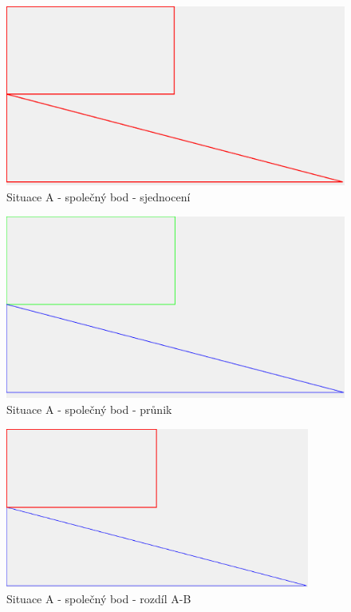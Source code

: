 \documentclass[a4paper,11pt,twoside]{article}
\begin{document}
\vspace{0.2cm}
\begin{figure}[hbt!] 
\begin{center}
\includegraphics[width=14cm]{pictures/A_union.png} 
\caption[Situace A - společný bod - sjednocení]{Situace A - společný bod - sjednocení}
\label{fig:A_union}
\end{center}
\end{figure}

\vspace{0.2cm}
\begin{figure}[hbt!] 
\begin{center}
\includegraphics[width=14cm]{pictures/A_intersect.png} 
\caption[Situace A - společný bod - průnik]{Situace A - společný bod - průnik}
\label{fig:A_intersect}
\end{center}
\end{figure}

\vspace{0.2cm}
\begin{figure}[hbt!] 
\begin{center}
\includegraphics[width=10cm]{pictures/A_diffAB.png} 
\caption[Situace A - společný bod - rozdíl A-B]{Situace A - společný bod - rozdíl A-B}
\label{fig:A_diffAB}
\end{center}
\end{figure}
\end{document}
